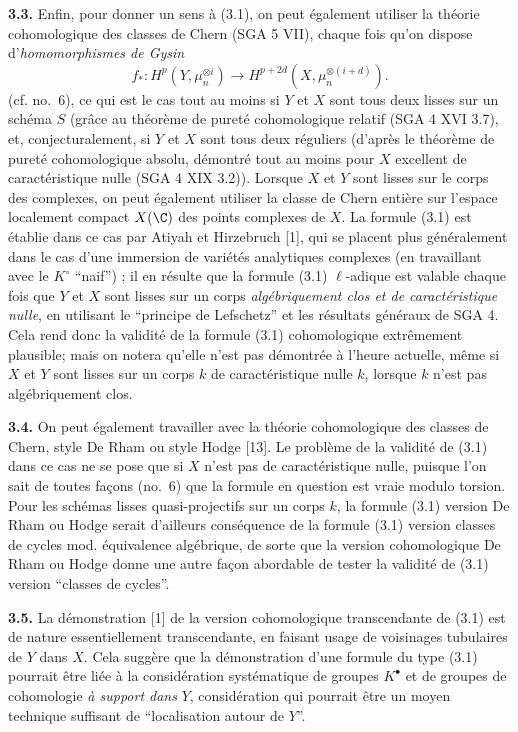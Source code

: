 \textbf{3.3.} Enfin, pour donner un sens à (3.1), on peut également utiliser la théorie cohomologique des classes de Chern (SGA 5 VII), chaque fois qu'on dispose d'\emph{homomorphismes de Gysin}
\[
 f_*:H^p(Y,\mu_n^{\otimes i})\longrightarrow H^{p+2d}(X,\mu_n^{\otimes(i+d)}).
\]
(cf. no.~6), ce qui est le cas tout au moins si $Y$ et $X$ sont tous deux lisses sur un schéma $S$ (grâce au théorème de pureté cohomologique relatif (SGA 4 XVI 3.7), et,
conjecturalement, si $Y$ et $X$ sont tous deux réguliers (d'après le théorème de pureté cohomologique absolu, démontré tout au moins pour $X$ excellent de caractéristique nulle (SGA 4 XIX 3.2)). Lorsque $X$ et $Y$ sont lisses sur le corps des complexes, on peut également utiliser la classe de Chern entière sur l'espace localement compact $X(\C)$ des points complexes de $X$. La formule (3.1) est établie dans ce cas par Atiyah et Hirzebruch [1], qui se placent plus généralement dans le cas d'une immersion de variétés analytiques complexes (en travaillant avec le $K^\circ$ ``naif'') ; il en résulte que la formule (3.1) $\ell$-adique est valable chaque fois que $Y$ et $X$ sont lisses sur un corps \emph{algébriquement clos et de caractéristique nulle}, en utilisant le ``principe de Lefschetz'' et les résultats généraux de SGA 4. Cela rend donc la validité de la formule (3.1) cohomologique extrêmement plausible; mais on notera qu'elle n'est pas démontrée à l'heure actuelle, même si $X$ et $Y$ sont lisses sur un corps $k$ de caractéristique nulle $k$, lorsque $k$ n'est pas algébriquement clos.

\textbf{3.4.} On peut également travailler avec la théorie cohomologique des classes de Chern, style De Rham ou style Hodge [13]. Le problème de la validité de (3.1) dans ce cas ne se pose que si $X$ n'est pas de caractéristique nulle, puisque l'on sait de toutes façons (no.~6) que la formule en question est vraie modulo torsion. Pour les schémas lisses quasi-projectifs sur un corps $k$, la formule (3.1) version De Rham ou Hodge serait d'ailleurs conséquence de la formule (3.1) version classes de cycles mod. équivalence algébrique, de sorte que la version cohomologique De Rham ou Hodge donne une autre façon abordable de tester la validité de (3.1) version ``classes de cycles''.

\textbf{3.5.} La démonstration [1] de la version cohomologique transcendante de (3.1) est de nature essentiellement transcendante, en faisant usage de voisinages tubulaires de $Y$ dans $X$. Cela suggère que la démonstration d'une formule du type (3.1) pourrait être liée à la considération systématique de groupes $K^\bullet$ et de groupes de cohomologie \emph{à support dans} $Y$, considération qui pourrait être un moyen technique suffisant de ``localisation autour de $Y$''.

